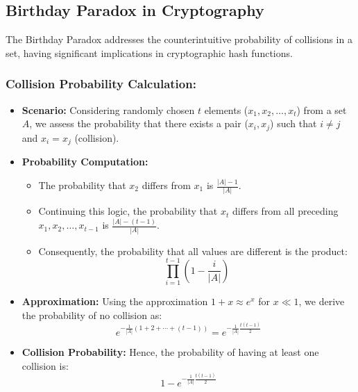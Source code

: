 \documentclass[12pt]{article}
\begin{document}
\subsection*{Birthday Paradox in Cryptography}

The Birthday Paradox addresses the counterintuitive probability of collisions in a set, having significant implications in cryptographic hash functions.

\subsubsection*{Collision Probability Calculation:}
\begin{itemize}
    \item \textbf{Scenario:} Considering randomly chosen \( t \) elements (\( x_1, x_2, \ldots, x_t \)) from a set \( A \), we assess the probability that there exists a pair (\( x_i, x_j \)) such that \( i \neq j \) and \( x_i = x_j \) (collision).
    \item \textbf{Probability Computation:} 
    \begin{itemize}
        \item The probability that \( x_2 \) differs from \( x_1 \) is \( \frac{|A|-1}{|A|} \).
        \item Continuing this logic, the probability that \( x_t \) differs from all preceding \( x_1, x_2, \ldots, x_{t-1} \) is \( \frac{|A|-(t-1)}{|A|} \).
        \item Consequently, the probability that all values are different is the product:
        \[
        \prod_{i=1}^{t-1} \left(1 - \frac{i}{|A|}\right)
        \]
    \end{itemize}
    \item \textbf{Approximation:} Using the approximation \( 1 + x \approx e^x \) for \( x \ll 1 \), we derive the probability of no collision as:
    \[
    e^{-\frac{1}{|A|}(1 + 2 + \cdots + (t-1))} = e^{-\frac{1}{|A|} \frac{t(t-1)}{2}}
    \]
    \item \textbf{Collision Probability:} Hence, the probability of having at least one collision is:
    \[
    1 - e^{-\frac{1}{|A|} \frac{t(t-1)}{2}}
    \]
\end{itemize}
\end{document}
